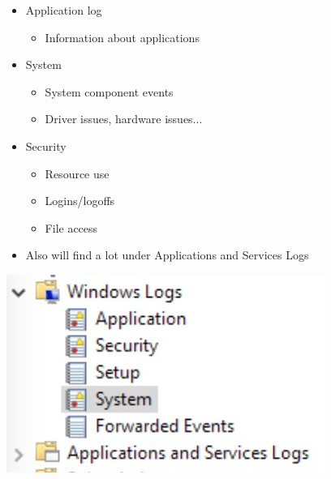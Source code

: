 \begin{minipage}[t]{0.5\textwidth}
\raggedright
\begin{itemize}
  \item Application log
  \begin{itemize}
    \item Information about applications
  \end{itemize}
  \item System
  \begin{itemize}
    \item System component events
    \item Driver issues, hardware issues...
  \end{itemize}
  \item Security
  \begin{itemize}
    \item Resource use
    \item Logins/logoffs
    \item File access
  \end{itemize}
  \item Also will find a lot under Applications and Services Logs
\end{itemize}\hfill
\end{minipage}
\begin{minipage}[t]{0.45\textwidth}
  \includegraphics[width=\textwidth]{resources/12-sysmon.png}
\end{minipage}

